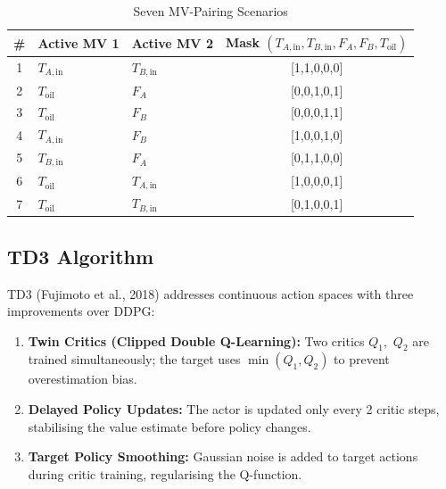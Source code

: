 \documentclass[12pt,a4paper]{article}
\begin{document}
\begin{table}[H]
  \centering
  \caption{Seven MV-Pairing Scenarios}
  \label{tab:scenarios}
  \renewcommand{\arraystretch}{1.3}
  \begin{tabular}{@{}cllc@{}}
    \toprule
    \textbf{\#} & \textbf{Active MV 1} & \textbf{Active MV 2}
      & \textbf{Mask} $(T_{A,\mathrm{in}},T_{B,\mathrm{in}},F_A,F_B,T_\mathrm{oil})$ \\
    \midrule
    1 & $T_{A,\mathrm{in}}$ & $T_{B,\mathrm{in}}$ & [1,1,0,0,0] \\
    2 & $T_\mathrm{oil}$    & $F_A$               & [0,0,1,0,1] \\
    3 & $T_\mathrm{oil}$    & $F_B$               & [0,0,0,1,1] \\
    4 & $T_{A,\mathrm{in}}$ & $F_B$               & [1,0,0,1,0] \\
    5 & $T_{B,\mathrm{in}}$ & $F_A$               & [0,1,1,0,0] \\
    6 & $T_\mathrm{oil}$    & $T_{A,\mathrm{in}}$ & [1,0,0,0,1] \\
    7 & $T_\mathrm{oil}$    & $T_{B,\mathrm{in}}$ & [0,1,0,0,1] \\
    \bottomrule
  \end{tabular}
\end{table}

\subsection{TD3 Algorithm}

TD3 (Fujimoto et al., 2018) addresses continuous action spaces with three
improvements over DDPG:

\begin{enumerate}
  \item \textbf{Twin Critics (Clipped Double Q-Learning):} Two critics
        $Q_1$,~$Q_2$ are trained simultaneously; the target uses
        $\min(Q_1,Q_2)$ to prevent overestimation bias.

  \item \textbf{Delayed Policy Updates:} The actor is updated only every 2
        critic steps, stabilising the value estimate before policy changes.

  \item \textbf{Target Policy Smoothing:} Gaussian noise is added to target
        actions during critic training, regularising the Q-function.
\end{enumerate}
\end{document}
